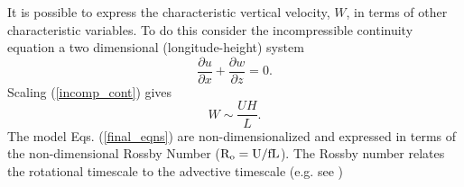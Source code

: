 \documentclass[times]{qjrms4}
\begin{document}
It is possible to express the characteristic vertical velocity, $W$, in terms of other 
characteristic variables. To do this consider the incompressible continuity equation a two
dimensional (longitude-height) system
 \begin{equation} \label{incomp_cont}
   \frac{\partial u}{\partial x} + \frac{\partial w}{\partial z} = 0.
 \end{equation}
Scaling (\ref{incomp_cont}) gives
 \begin{equation}
    W \sim \frac{UH}{L}.  
 \end{equation}
The model Eqs. (\ref{final_eqns}) are non-dimensionalized and expressed in terms of the
non-dimensional Rossby Number ($\rm{R_o} = U / fL$).  The Rossby number relates the rotational 
timescale to the advective timescale (e.g. see \cite{holton, vallis}) 
\end{document}
